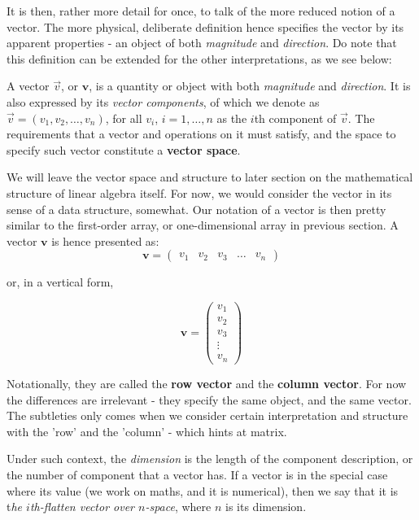 It is then, rather more detail for once, to talk of the more reduced notion of a vector. The more physical, deliberate definition hence specifies the vector by its apparent properties - an object of both \textit{magnitude} and \textit{direction}. Do note that this definition can be extended for the other interpretations, as we see below: 
\begin{definition}[Vector]
    A vector $\vec{v}$, or $\mathbf{v}$, is a quantity or object with both \textit{magnitude} and \textit{direction}. It is also expressed by its \textit{vector components}, of which we denote as $\vec{v}=(v_1, v_2,\dots,v_n)$, for all $v_i$, $i=1,\dots,n$ as the $i$th component of $\vec{v}$. The requirements that a vector and operations on it must satisfy, and the space to specify such vector constitute a \textbf{vector space}. 
\end{definition}

We will leave the vector space and structure to later section on the mathematical structure of linear algebra itself. For now, we would consider the vector in its sense of a data structure, somewhat. Our notation of a vector is then pretty similar to the first-order array, or one-dimensional array in previous section. A vector $\mathbf{v}$ is hence presented as: 
\begin{equation}
    \mathbf{v} = \begin{pmatrix}
        v_{1} & v_{2} & v_{3} & \dots & v_{n}
    \end{pmatrix}
\end{equation}

or, in a vertical form, 

\begin{equation}
    \mathbf{v} = \begin{pmatrix}
        v_{1} \\
        v_{2} \\ 
        v_{3} \\
        \vdots \\
        v_{n} 
    \end{pmatrix}
\end{equation}

Notationally, they are called the \textbf{row vector} and the \textbf{column vector}. For now the differences are irrelevant - they specify the same object, and the same vector. The subtleties only comes when we consider certain interpretation and structure with the 'row' and the 'column' - which hints at matrix. 

Under such context, the \textit{dimension} is the length of the component description, or the number of component that a vector has. If a vector is in the special case where its value (we work on maths, and it is numerical), then we say that it is t\textit{he $i$th-flatten vector over $n$-space}, where $n$ is its dimension. 


